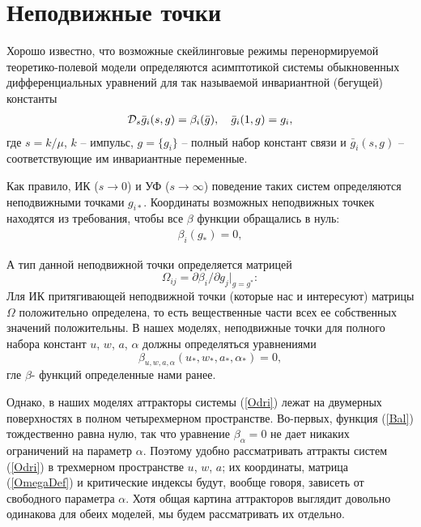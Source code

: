 \documentclass[a4paper,10pt]{article}
\def\D{{\cal D}}
\def\D{{\cal D}}
\begin{document}
\section{Неподвижные точки} \label{sec:FPS}

Хорошо известно, что возможные скейлинговые  режимы перенормируемой теоретико-полевой 
модели определяются асимптотикой системы обыкновенных дифференциальных уравнений для так называемой 
инвариантной (бегущей) константы
\begin{eqnarray}
\D_s \bar g_{i}(s,g) = \beta_{i} (\bar g), \quad \bar g_{i}(1,g) = g_{i},
\label{Odri}
\end{eqnarray}
где  $s=k/\mu$, $k$ -- импульс, $g= \{g_{i}\}$ -- полный набор констант связи
и  $\bar g_{i}(s,g)$ -- соответствующие им инвариантные переменные.

Как правило, ИК ($s\to0$) и УФ ($s\to\infty$) поведение таких систем определяются неподвижными точками $g_{i*}$.
Координаты возможных неподвижных точкек находятся из требования, чтобы все   $\beta$ функции обращались в нуль:
\begin{eqnarray}
\beta_{i} (g_{*}) =0,
\label{fp}
\end{eqnarray}

 А тип данной неподвижной точки определяется матрицей 
\begin{equation}
\Omega_{ij} = \partial\beta_{i}/\partial g_{j} |_{g=g^*}:
\label{OmegaDef}
\end{equation}
Лля ИК притягивающей неподвижной точки (которые нас и  интересуют) 
матрицы $\Omega$ положительно определена, то есть вещественные части всех ее собственных значений положительны.
В нашех моделях, неподвижные точки для полного набора констант $u$, $w$, $a$, $\alpha$ должны определяться уравнениями 
\begin{equation}
\beta_{u,w,a,\alpha} (u_{*},w_{*},a_{*},\alpha_{*}) = 0,
\label{points}
\end{equation}
гле $\beta$- функций определенные нами ранее.

Однако, в наших моделях аттракторы системы (\ref{Odri}) лежат на двумерных поверхностях в полном четырехмерном пространстве.
Во-первых, функция (\ref{Bal})  тождественно равна нулю, так что уравнение $\beta_{\alpha}=0$ не дает никаких ограничений на параметр  $\alpha$.
Поэтому удобно рассматривать аттракты систем (\ref{Odri}) в трехмерном пространстве $u$, $w$, $a$; их координаты, матрица (\ref{OmegaDef})
и критические индексы будут, вообще говоря, зависеть от свободного параметра $\alpha$.
Хотя общая картина аттракторов выглядит довольно одинакова для обеих моделей, мы будем рассматривать их отдельно.
\end{document}
